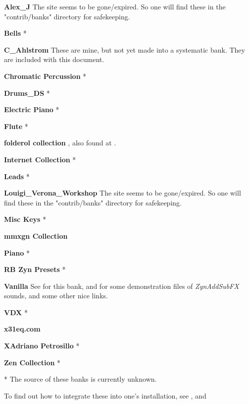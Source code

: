    \begin{enumber}
      \item \textbf{Alex\_J}
         The site seems to be gone/expired. So one will find these in the
         "contrib/banks" directory for safekeeping.
      \item \textbf{Bells}
         *
      \item \textbf{C\_Ahlstrom}
         These are mine, but not yet made into a systematic bank.
         They are included with this document.
      \item \textbf{Chromatic Percussion}
         *
      \item \textbf{Drums\_DS}
         *
      \item \textbf{Electric Piano}
         *
      \item \textbf{Flute}
         *
      \item \textbf{folderol collection}
         \cite{folderol}, also found at \cite{zyndemos}.
      \item \textbf{Internet Collection}
         *
      \item \textbf{Leads}
         *
      \item \textbf{Louigi\_Verona\_Workshop}
         The site seems to be gone/expired. So one will find these in the
         "contrib/banks" directory for safekeeping.
      \item \textbf{Misc Keys}
         *
      \item \textbf{mmxgn Collection} \cite{mmxgn}
      \item \textbf{Piano}
         *
      \item \textbf{RB Zyn Presets}
         *
      \item \textbf{Vanilla}
         See \cite{zyndemos} for this bank, and for some demonstration files
         of \textsl{ZynAddSubFX} sounds, and some other nice links.
      \item \textbf{VDX}
         *
      \item \textbf{x31eq.com} \cite{x31eq}
      \item \textbf{XAdriano Petrosillo}
         *
      \item \textbf{Zen Collection}
         *
   \end{enumber}
   * The source of these banks is currently unknown.


   To find out how to integrate these into one's installation, see
   , and

